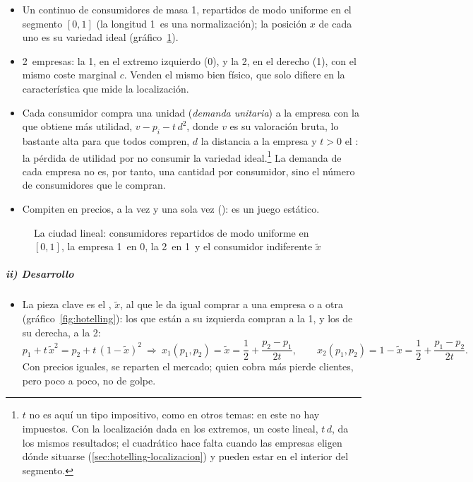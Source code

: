 \documentclass[11pt]{article}
\begin{document}
\begin{itemize}
\item Un continuo de consumidores de masa 1, repartidos de modo uniforme en el segmento $[0,1]$ (la longitud 1~es una normalización); la posición $x$ de cada uno es su variedad ideal (gráfico~\ref{fig:hotelling-uniforme}).
\item 2~empresas: la 1, en el extremo izquierdo (0), y la 2, en el derecho (1), con el mismo coste marginal $c$. Venden el mismo bien físico, que solo difiere en la característica que mide la localización.
\item Cada consumidor compra una unidad (\emph{demanda unitaria}) a la empresa con la que obtiene más utilidad, $v-p_i-t\,d^2$, donde $v$ es su valoración bruta, lo bastante alta para que todos compren, $d$ la distancia a la empresa y $t>0$ el : la pérdida de utilidad por no consumir la variedad ideal.\footnote{$t$ no es aquí un tipo impositivo, como en otros temas: en este no hay impuestos. Con la localización dada en los extremos, un coste lineal, $t\,d$, da los mismos resultados; el cuadrático hace falta cuando las empresas eligen dónde situarse (\ref{sec:hotelling-localizacion}) y pueden estar en el interior del segmento.} La demanda de cada empresa no es, por tanto, una cantidad por consumidor, sino el número de consumidores que le compran.
\item Compiten en precios, a la vez y una sola vez (): es un juego estático.
\end{itemize}

\begin{figure}[H]
\centering
\caption{La ciudad lineal: consumidores repartidos de modo uniforme en $[0,1]$, la empresa 1~en 0, la 2~en 1~y el consumidor indiferente $\tilde{x}$}\label{fig:hotelling-uniforme}
\end{figure}

\subparagraph{ii) Desarrollo}

\begin{itemize}
\item La pieza clave es el , $\tilde{x}$, al que le da igual comprar a una empresa o a otra (gráfico~\ref{fig:hotelling}): los que están a su izquierda compran a la 1, y los de su derecha, a la 2:
  \begin{equation}\label{eq:hotelling-indiferente}
  p_1+t\,\tilde{x}^2=p_2+t\,(1-\tilde{x})^2\ \Longrightarrow\ x_1(p_1,p_2)=\tilde{x}=\frac{1}{2}+\frac{p_2-p_1}{2t},\qquad x_2(p_1,p_2)=1-\tilde{x}=\frac{1}{2}+\frac{p_1-p_2}{2t}.
  \end{equation}
  Con precios iguales, se reparten el mercado; quien cobra más pierde clientes, pero poco a poco, no de golpe.
\end{itemize}
\end{document}
